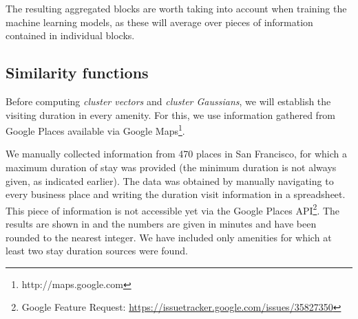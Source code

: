 The resulting aggregated blocks are worth taking into account when training the machine learning models, as these will average over pieces of information contained in individual blocks. 

\subsection{Similarity functions}
\label{experimental_setup:urban_measure}
Before computing \textit{cluster vectors} and \textit{cluster Gaussians}, we will establish the visiting duration in every amenity.
For this, we use information gathered from Google Places available via Google Maps\footnote{http://maps.google.com}.

We manually collected information from 470 places in San Francisco, for which a maximum duration of stay was provided (the minimum duration is not always given, as indicated earlier).
The data was obtained by manually navigating to every business place and writing the duration visit information in a spreadsheet.
This piece of information is not accessible yet via the Google Places API\footnote{Google Feature Request: \url{https://issuetracker.google.com/issues/35827350}}.
The results are shown in  and the numbers are given in minutes and have been rounded to the nearest integer. We have included only amenities for which at least two stay duration sources were found. 

